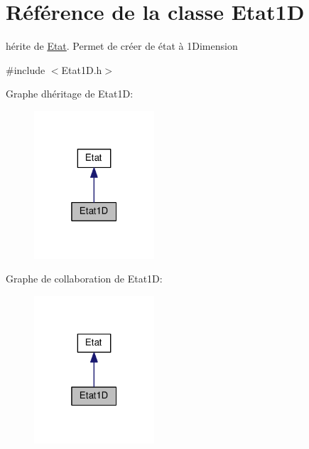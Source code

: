 \hypertarget{class_etat1_d}{}\section{Référence de la classe Etat1D}
\label{class_etat1_d}


hérite de \hyperlink{class_etat}{Etat}. Permet de créer de état à 1\+Dimension  




{\ttfamily \#include $<$Etat1\+D.\+h$>$}



Graphe d\textquotesingle{}héritage de Etat1D\+:\nopagebreak
\begin{figure}[H]
\begin{center}
\leavevmode
\includegraphics[width=127pt]{class_etat1_d__inherit__graph}
\end{center}
\end{figure}


Graphe de collaboration de Etat1D\+:\nopagebreak
\begin{figure}[H]
\begin{center}
\leavevmode
\includegraphics[width=127pt]{class_etat1_d__coll__graph}
\end{center}
\end{figure}
